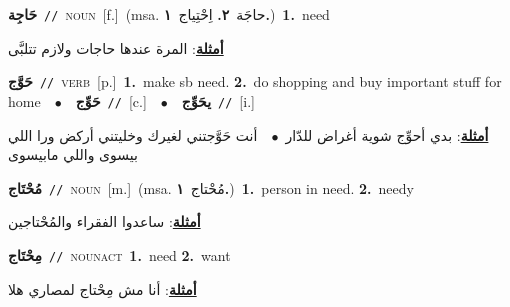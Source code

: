 \documentclass[10pt,a4paper,twoside]{article} %
\begin{document}
\begin{multicols}{2}
{\setlength\topsep{0pt}\textbf{\foreignlanguage{arabic}{حَاجِة}}\ {\color{gray}\texttt{//}\color{black}}\ \textsc{noun}\ [f.]\ \color{gray}(msa. \foreignlanguage{arabic}{حاجَة}~\foreignlanguage{arabic}{\textbf{٢.}}  \foreignlanguage{arabic}{اِحْتِياج}~\foreignlanguage{arabic}{\textbf{١.}})\color{black}\ \textbf{1.}~need\  \begin{flushright}\color{gray}\foreignlanguage{arabic}{\textbf{\underline{\foreignlanguage{arabic}{أمثلة}}}: المرة عندها حاجات ولازم تتلبَّى}\end{flushright}\color{black}} \vspace{2mm}

{\setlength\topsep{0pt}\textbf{\foreignlanguage{arabic}{حَوَّج}}\ {\color{gray}\texttt{//}\color{black}}\ \textsc{verb}\ [p.]\ \textbf{1.}~make sb need.  \textbf{2.}~do shopping and buy important stuff for home\ \ $\bullet$\ \ \setlength\topsep{0pt}\textbf{\foreignlanguage{arabic}{حَوِّج}}\ {\color{gray}\texttt{//}\color{black}}\ [c.]\ \ $\bullet$\ \ \setlength\topsep{0pt}\textbf{\foreignlanguage{arabic}{يحَوِّج}}\ {\color{gray}\texttt{//}\color{black}}\ [i.]\  \begin{flushright}\color{gray}\foreignlanguage{arabic}{\textbf{\underline{\foreignlanguage{arabic}{أمثلة}}}: بدي أحوِّج شوية أغراض للدّار\ $\bullet$\ \  أنت حَوَّجتني لغيرك وخليتني أركض ورا اللي بيسوى واللي مابيسوى}\end{flushright}\color{black}} \vspace{2mm}

{\setlength\topsep{0pt}\textbf{\foreignlanguage{arabic}{مُحْتَاج}}\ {\color{gray}\texttt{//}\color{black}}\ \textsc{noun}\ [m.]\ \color{gray}(msa. \foreignlanguage{arabic}{مُحْتاج}~\foreignlanguage{arabic}{\textbf{١.}})\color{black}\ \textbf{1.}~person in need.  \textbf{2.}~needy\  \begin{flushright}\color{gray}\foreignlanguage{arabic}{\textbf{\underline{\foreignlanguage{arabic}{أمثلة}}}: ساعدوا الفقراء والمُحْتاجين}\end{flushright}\color{black}} \vspace{2mm}

{\setlength\topsep{0pt}\textbf{\foreignlanguage{arabic}{مِحْتَاج}}\ {\color{gray}\texttt{//}\color{black}}\ \textsc{noun\textunderscore act}\ \textbf{1.}~need  \textbf{2.}~want\  \begin{flushright}\color{gray}\foreignlanguage{arabic}{\textbf{\underline{\foreignlanguage{arabic}{أمثلة}}}: أنا مش مِحْتاج لمصاري هلا}\end{flushright}\color{black}} \vspace{2mm}


\end{multicols}
\end{document}
